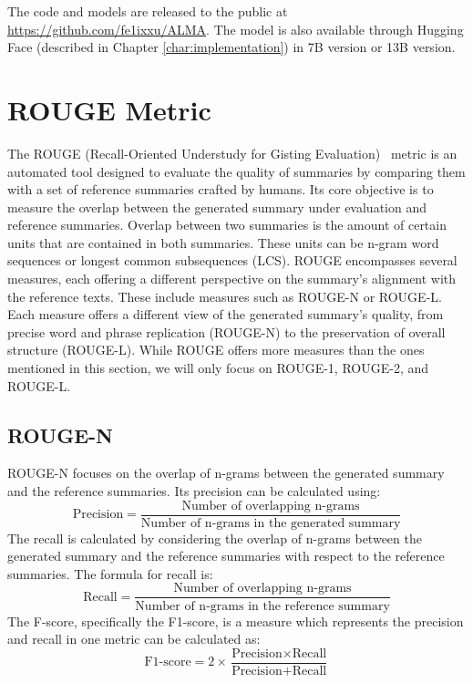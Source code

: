 \documentclass[english, ba, kiv, he, iso690numb, pdf, viewonly]{fasthesis}
\begin{document}
The code and models are released to the public at \url{https://github.com/fe1ixxu/ALMA}. The model is also available through Hugging Face (described in Chapter \ref{char:implementation}) in 7B version or 13B version.

\section{ROUGE Metric}
The ROUGE (Recall-Oriented Understudy for Gisting Evaluation)~\cite{lin-2004-rouge} metric is an automated tool designed to evaluate the quality of summaries by comparing them with a set of reference summaries crafted by humans. Its core objective is to measure the overlap between the generated summary under evaluation and reference summaries. Overlap between two summaries is the amount of certain units that are contained in both summaries. These units can be n-gram word sequences or longest common subsequences (LCS).
ROUGE encompasses several measures, each offering a different perspective on the summary's alignment with the reference texts. These include measures such as ROUGE-N or ROUGE-L. Each measure offers a different view of the generated summary's quality, from precise word and phrase replication (ROUGE-N) to the preservation of overall structure (ROUGE-L). While ROUGE offers more measures than the ones mentioned in this section, we will only focus on ROUGE-1, ROUGE-2, and ROUGE-L.
\subsection{ROUGE-N}
ROUGE-N focuses on the overlap of n-grams between the generated summary and the reference summaries. Its precision can be calculated using:
$$ \text{Precision} = \frac{\text{Number of overlapping n-grams}}{\text{Number of n-grams in the generated summary}} $$
The recall is calculated by considering the overlap of n-grams between the generated summary and the reference summaries with respect to the reference summaries. The formula for recall is:
$$
\text{Recall} = \frac{\text{Number of overlapping n-grams}}{\text{Number of n-grams in the reference summary}}
$$
The F-score, specifically the F1-score, is a measure which represents the precision and recall in one metric can be calculated as:
$$
\text{F1-score} = 2 \times \frac{\text{Precision} \times \text{Recall}}{\text{Precision} + \text{Recall}}
$$
\end{document}
